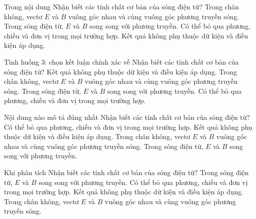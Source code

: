 \begin{ex}
Trong nội dung Nhận biết các tính chất cơ bản của sóng điện từ?
\choice
{\True Trong chân không, vectơ $E$ và $B$ vuông góc nhau và cùng vuông góc phương truyền sóng.}
{Trong sóng điện từ, $E$ và $B$ song song với phương truyền.}
{Có thể bỏ qua phương, chiều và đơn vị trong mọi trường hợp.}
{Kết quả không phụ thuộc dữ kiện và điều kiện áp dụng.}
\end{ex}

\begin{ex}
Tình huống 3: chọn kết luận chính xác về Nhận biết các tính chất cơ bản của sóng điện từ?
\choice
{Kết quả không phụ thuộc dữ kiện và điều kiện áp dụng.}
{\True Trong chân không, vectơ $E$ và $B$ vuông góc nhau và cùng vuông góc phương truyền sóng.}
{Trong sóng điện từ, $E$ và $B$ song song với phương truyền.}
{Có thể bỏ qua phương, chiều và đơn vị trong mọi trường hợp.}
\end{ex}

\begin{ex}
Nội dung nào mô tả đúng nhất Nhận biết các tính chất cơ bản của sóng điện từ?
\choice
{Có thể bỏ qua phương, chiều và đơn vị trong mọi trường hợp.}
{Kết quả không phụ thuộc dữ kiện và điều kiện áp dụng.}
{\True Trong chân không, vectơ $E$ và $B$ vuông góc nhau và cùng vuông góc phương truyền sóng.}
{Trong sóng điện từ, $E$ và $B$ song song với phương truyền.}
\end{ex}

\begin{ex}
Khi phân tích Nhận biết các tính chất cơ bản của sóng điện từ?
\choice
{Trong sóng điện từ, $E$ và $B$ song song với phương truyền.}
{Có thể bỏ qua phương, chiều và đơn vị trong mọi trường hợp.}
{Kết quả không phụ thuộc dữ kiện và điều kiện áp dụng.}
{\True Trong chân không, vectơ $E$ và $B$ vuông góc nhau và cùng vuông góc phương truyền sóng.}
\end{ex}

